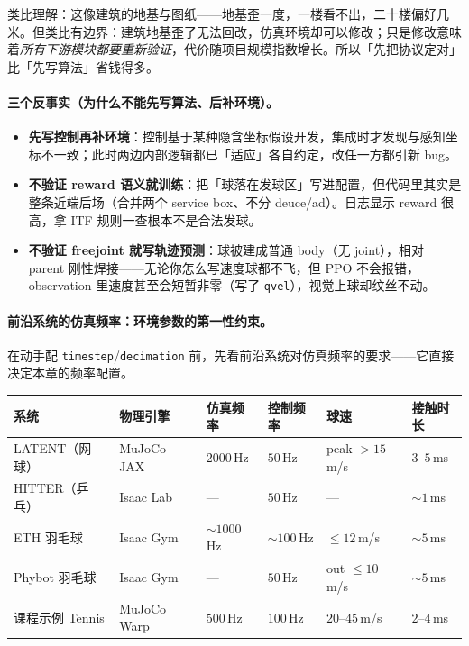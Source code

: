 类比理解：这像建筑的地基与图纸——地基歪一度，一楼看不出，二十楼偏好几米。但类比有边界：建筑地基歪了无法回改，仿真环境却可以修改；只是修改意味着\emph{所有下游模块都要重新验证}，代价随项目规模指数增长。所以「先把协议定对」比「先写算法」省钱得多。

\paragraph{三个反事实（为什么不能先写算法、后补环境）。}
\begin{itemize}
  \item \textbf{先写控制再补环境}：控制基于某种隐含坐标假设开发，集成时才发现与感知坐标不一致；此时两边内部逻辑都已「适应」各自约定，改任一方都引新 bug。
  \item \textbf{不验证 reward 语义就训练}：把「球落在发球区」写进配置，但代码里其实是整条近端后场（合并两个 service box、不分 deuce/ad）。日志显示 reward 很高，拿 ITF 规则一查根本不是合法发球。
  \item \textbf{不验证 freejoint 就写轨迹预测}：球被建成普通 body（无 joint），相对 parent 刚性焊接——无论你怎么写速度球都不飞，但 PPO 不会报错，observation 里速度甚至会短暂非零（写了 \verb|qvel|），视觉上球却纹丝不动。
\end{itemize}

\paragraph{前沿系统的仿真频率：环境参数的第一性约束。}在动手配 \verb|timestep|/\allowbreak\verb|decimation| 前，先看前沿系统对仿真频率的要求——它直接决定本章的频率配置。

\begin{center}
\small
\begin{tabular}{@{}llllll@{}}
\toprule
系统 & 物理引擎 & 仿真频率 & 控制频率 & 球速 & 接触时长 \\
\midrule
LATENT（网球）\cite{tennis_latent2026} & MuJoCo JAX & $2000$\,Hz & $50$\,Hz & peak $>15$\,m/s & $3$--$5$\,ms \\
HITTER（乒乓）\cite{tennis_hitter2025} & Isaac Lab & — & $50$\,Hz & — & $\sim1$\,ms \\
ETH 羽毛球 \cite{tennis_eth2025badminton} & Isaac Gym & $\sim1000$\,Hz & $\sim100$\,Hz & $\le12$\,m/s & $\sim5$\,ms \\
Phybot 羽毛球 \cite{tennis_phybot2025} & Isaac Gym & — & $50$\,Hz & out $\le10$\,m/s & $\sim5$\,ms \\
课程示例 Tennis & MuJoCo Warp & $500$\,Hz & $100$\,Hz & $20$--$45$\,m/s & $2$--$4$\,ms \\
\bottomrule
\end{tabular}
\end{center}

